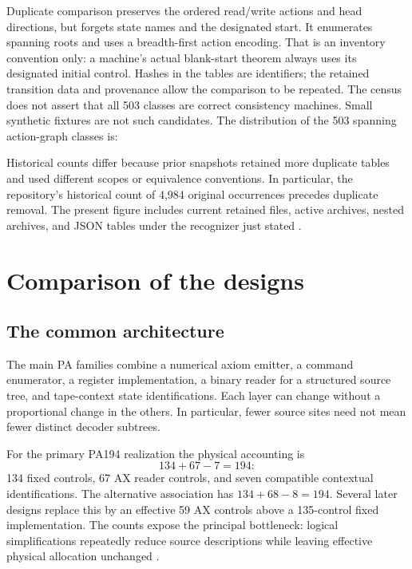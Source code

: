 \documentclass[11pt,letterpaper]{article}
\begin{document}
Duplicate comparison preserves the ordered read/write actions and head
directions, but forgets state names and the designated start. It enumerates
spanning roots and uses a breadth-first action encoding. That is an
inventory convention only: a machine's actual blank-start theorem always
uses its designated initial control. Hashes in the tables are identifiers;
the retained transition data and provenance allow the comparison to be
repeated. The census does not assert that all 503 classes are correct
consistency machines. Small synthetic fixtures are not such candidates.
The distribution of the 503 spanning action-graph classes is:


Historical counts differ because prior snapshots retained more duplicate
tables and used different scopes or equivalence conventions. In particular,
the repository's historical  count of 4,984 original
 occurrences precedes duplicate removal. The present figure
includes current retained files, active archives, nested archives, and
JSON tables under the recognizer just stated \cite{pa-docs}.

\section{Comparison of the designs}
\label{sec:comparison}

\subsection{The common architecture}

The main PA families combine a numerical axiom emitter, a command
enumerator, a register implementation, a binary reader for a structured
source tree, and tape-context state identifications. Each layer can
change without a proportional change in the others. In particular, fewer
source sites need not mean fewer distinct decoder subtrees.

For the primary PA194 realization the physical accounting is
\[
             134+67-7=194:
\]
134 fixed controls, 67 AX reader controls, and seven compatible contextual
identifications. The alternative association has $134+68-8=194$.
Several later designs replace this by an effective 59 AX controls above
a 135-control fixed implementation. The counts expose the principal
bottleneck: logical simplifications repeatedly reduce source descriptions
while leaving effective physical allocation unchanged \cite{primary,radix}.
\end{document}
